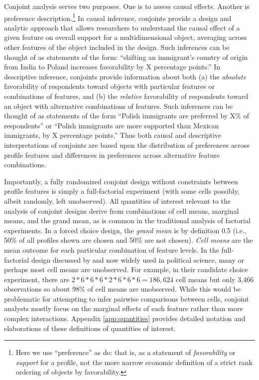 \documentclass[a4paper,12pt]{article}\usepackage[]{graphicx}\usepackage[]{color}
\begin{document}
Conjoint analysis serves two purposes. One is to assess causal effects. Another is preference description.\footnote{Here we use ``preference'' as \citet{HainmuellerHopkinsYamamoto2014} do: that is, as a statement of \textit{favorability} or \textit{support} for a profile, not the more narrow economic definition of a strict rank ordering of objects by favorability.} In causal inference, conjoints provide a design and analytic approach that allows researchers to understand the causal effect of a given feature on overall support for a multidimensional object, averaging across other features of the object included in the design. Such inferences can be thought of as statements of the form: ``shifting an immigrant's country of origin from India to Poland increases favorability by X percentage points.'' In descriptive inference, conjoints provide information about both (a) the \textit{absolute} favorability of respondents toward objects with particular features or combinations of features, and (b) the \textit{relative} favorability of respondents toward an object with alternative combinations of features. Such inferences can be thought of as statements of the form ``Polish immigrants are preferred by X\% of respondents'' or ``Polish immigrants are more supported than Mexican immigrants, by X percentage points.'' Thus both causal and descriptive interpretations of conjoints are based upon the distribution of preferences across profile features and differences in preferences across alternative feature combinations.

Importantly, a fully randomized conjoint design without constraints between profile features is simply a full-factorial experiment (with some cells possibly, albeit randomly, left unobserved). All quantities of interest relevant to the analysis of conjoint designs derive from combinations of cell means, marginal means, and the grand mean, as is common in the traditional analysis of factorial experiments. In a forced choice design, the \textit{grand mean} is by definition 0.5 (i.e., 50\% of all profiles shown are chosen and 50\% are not chosen). \textit{Cell means} are the mean outcome for each particular combination of feature levels. In the full-factorial design discussed by \citet{HainmuellerHopkinsYamamoto2014} and now widely used in political science, many or perhaps most cell means are unobserved. For example, in their candidate choice experiment, there are $2*6*6*6*2*6*6*6 = 186,624$ cell means but only 3,466 observations so about 98\% of cell means are unobserved. While this would be problematic for attempting to infer pairwise comparisons between cells, conjoint analysts mostly focus on the marginal effects of each feature rather than more complex interactions. Appendix \ref{app:quantities} provides detailed notation and elaborations of these definitions of quantities of interest.
\end{document}
